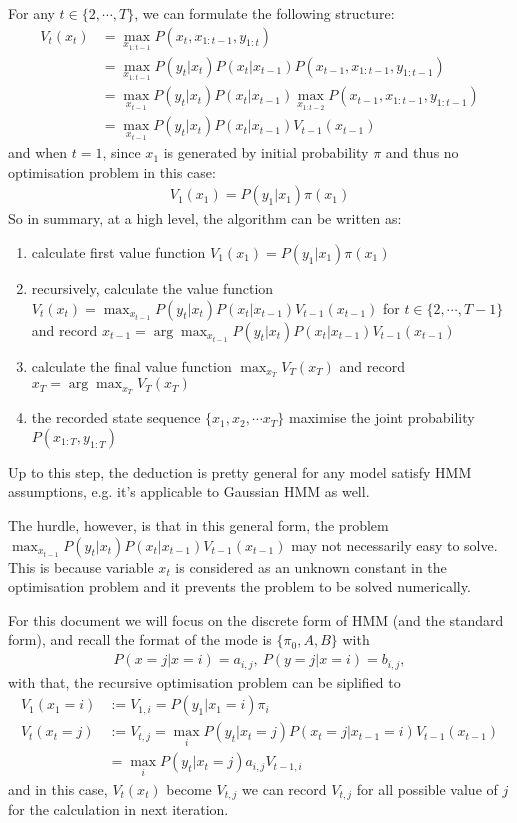 \documentclass{article} [10pt] %
\begin{document}
For any $t\in \{2,\cdots,T\}$, we can formulate the following structure:
\begin{align}
	V_{t}(x_t) &= \max_{x_{1:t-1}}P(x_t, x_{1:t-1}, y_{1:t})\\
			&=\max_{x_{1:t-1}}P(y_t|x_t)P(x_{t}|x_{t-1})P(x_{t-1}, x_{1:t-1}, y_{1:t-1})\\
			&=\max_{x_{t-1}}P(y_t|x_t)P(x_{t}|x_{t-1})\max_{x_{1:t-2}}P(x_{t-1}, x_{1:t-1}, y_{1:t-1})\\
			&=\max_{x_{t-1}}P(y_t|x_t)P(x_{t}|x_{t-1})V_{t-1}(x_{t-1})
\end{align}
and when $t=1$, since $x_1$ is generated by initial probability $\pi$ and thus no optimisation problem in this case:
\begin{align}
	V_1(x_1)=P(y_1|x_1)\pi(x_1)
\end{align}
So in summary, at a high level, the algorithm can be written as:
\begin{enumerate}
	\item calculate first value function $V_1(x_1)=P(y_1|x_1)\pi(x_1)$
	\item recursively, calculate the value function  $V_{t}(x_t)=\max_{x_{t-1}}P(y_t|x_t)P(x_{t}|x_{t-1})V_{t-1}(x_{t-1})$ for $t\in \{2,\cdots,T-1\}$ and record $x_{t-1} = \arg\max_{x_{t-1}}P(y_t|x_t)P(x_{t}|x_{t-1})V_{t-1}(x_{t-1})$
	\item calculate the final value function $\max_{x_T}V_T(x_T)$ and record $x_T=\arg\max_{x_T}V_T(x_T)$
	\item the recorded state sequence $\{x_1, x_2, \cdots x_T\}$ maximise the joint probability $P(x_{1:T}, y_{1:T})$
\end{enumerate}
Up to this step, the deduction is pretty general for any model satisfy HMM assumptions, e.g. it's applicable to Gaussian HMM as well.

The hurdle, however, is that in this general form, the problem $\max_{x_{t-1}}P(y_t|x_t)P(x_{t}|x_{t-1})V_{t-1}(x_{t-1})$ may not necessarily easy to solve. This is because variable $x_t$ is considered as an unknown constant in the optimisation problem and it prevents the problem to be solved numerically.

For this document we will focus on the discrete form of HMM (and the standard form), and recall the format of the mode is $\{\pi_0, A, B\}$ with
\begin{align}
	P(x=j|x=i)=a_{i,j},\ P(y=j|x=i) = b_{i,j}, 
\end{align}
with that, the recursive optimisation problem can be siplified to 
\begin{align*}
	V_1(x_1=i) &:= V_{1, i} = P(y_1|x_1=i)\pi_i\\
	V_{t}(x_t=j)&:= V_{t, j} =\max_{i}P(y_t|x_t=j)P(x_t=j|x_{t-1}=i)V_{t-1}(x_{t-1})	\\
			&=	\max_{i}P(y_t|x_t=j)a_{i, j}V_{t-1, i}
\end{align*}
and in this case, $V_t(x_t)$ become $V_{t, j}$ we can record $V_{t, j}$ for all possible value of $j$ for the calculation in next iteration.
\end{document}
